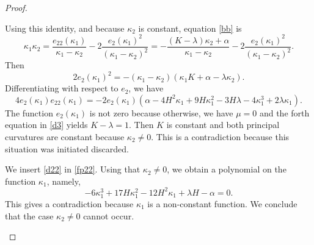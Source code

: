 \documentclass[10pt,a4paper]{amsart}
\begin{document}
\begin{proof}
\begin{enumerate}
Using this identity, and because $\kappa_2$ is constant, equation \eqref{bb} is 
$$\kappa_1\kappa_2=\frac{e_{22}(\kappa_1)}{\kappa_1-\kappa_2}-2\frac{e_2(\kappa_1)^2}{(\kappa_1-\kappa_2)^2}=
-\frac{(K-\lambda)\kappa_2+\alpha}{\kappa_1-\kappa_2}-2\frac{e_2(\kappa_1)^2}{(\kappa_1-\kappa_2)^2}.$$
 Then 
 $$2e_2(\kappa_1)^2=-(\kappa_1-\kappa_2)(\kappa_1 K+\alpha-\lambda\kappa_2).$$
 Differentiating with respect to $e_2$, we have 
 \begin{equation}\label{fp22}
4e_2(\kappa_1)e_{22}(\kappa_1)=-2e_2(\kappa_1)\left(   \alpha -4 H^2 \kappa_1+9 H \kappa_1^2-3 H \lambda -4 \kappa_1^3+2 \lambda  \kappa_1 \right).
\end{equation}
 The function  $e_2(\kappa_1)$ is not zero because otherwise, we have $\mu=0$ and the forth equation in \eqref{d3} yields $K-\lambda=1$. Then  $K$ is constant and  both principal curvatures are constant because $\kappa_2\not=0$. This is a contradiction because this situation was initiated discarded.
 
   
  
 We insert  \eqref{d22} in \eqref{fp22}. Using that $\kappa_2\not=0$, we obtain  a polynomial on the function $\kappa_1$, namely, 
 $$-6 \kappa_1^3+17H\kappa_1^2-12H^2\kappa_1+\lambda H-\alpha =0.$$
  This gives a contradiction because $\kappa_1$ is a non-constant function. We conclude that the case $\kappa_2\not=0$ cannot occur.
 \end{enumerate}
  \end{proof}
\end{document}
